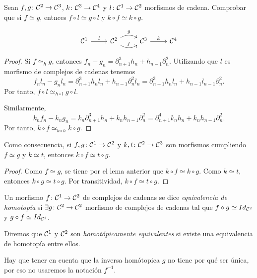 \documentclass[HS.tex]{subfiles}
\begin{document}
\begin{lemma}
Sean $f,g \colon \mathcal{C}^2 \to \mathcal{C}^3$, $k \colon \mathcal{C}^3 \to \mathcal{C}^4$ y $l \colon \mathcal{C}^1 \to \mathcal{C}^2$ morfismos de cadena. Comprobar que si $f \simeq g$, entnces $f \circ l \simeq g \circ l$ y $k \circ f \simeq k \circ g$.

\[
\begin{tikzcd}
\CC^1 \arrow[r,"l"] & \CC^2 \arrow[r,bend right,"f"] \arrow[r,bend left,"g"]& \CC^3 \arrow[r,"k"] & \CC^4
\end{tikzcd}
\]
\end{lemma}
\begin{proof}
Si $f\simeq_h g$, entonces $f_n-g_n=\partial^3_{n+1}h_n+h_{n-1}\partial_n^2$. Utilizando que $l$ es morfismo de complejos de cadenas tenemos 
\[
f_nl_n-g_nl_n=\partial^3_{n+1}h_nl_n+h_{n-1}\partial_n^2l_n=\partial^3_{n+1}h_nl_n+h_{n-1}l_{n-1}\partial_n^2.
\]
Por tanto, $f\circ l\simeq_{h\circ l} g\circ l$.

Similarmente, 
\[
k_nf_n-k_ng_n=k_n\partial^3_{n+1}h_n+k_nh_{n-1}\partial_n^2=\partial^4_{n+1}k_nh_n+k_nh_{n-1}\partial_n^2.
\]
Por tanto, $k\circ f\simeq_{k\circ h} k\circ g$. 
\end{proof}

\begin{coro}
Como consecuencia, si $f, g \colon \mathcal{C}^1 \to \mathcal{C}^2$ y $k,t \colon \mathcal{C}^2 \to \mathcal{C}^3$ son morfismos cumpliendo $f \simeq g$ y $k \simeq t$, entonces $k \circ f \simeq t \circ g$.
\end{coro}
\begin{proof}
Como $f \simeq g$, se tiene por el lema anterior que $k \circ f \simeq k \circ g$.
Como $k \simeq t$, entonces $k \circ g \simeq t \circ g$.
Por transitividad, $k \circ f \simeq t \circ g$.
\end{proof}

\begin{defi}
Un morfismo $f \colon \mathcal{C}^1 \to \mathcal{C}^2$ de complejos de cadenas se dice \emph{equivalencia de homotopía} si $\exists g \colon \mathcal{C}^2 \to \mathcal{C}^2$ morfismo de complejos de cadenas tal que $f \circ g \simeq Id_{\mathcal{C}^2}$ y $g \circ f \simeq Id_{\mathcal{C}^1}$.

Diremos que $\mathcal{C}^1$ y $\mathcal{C}^2$ son \emph{homotópicamente equivalentes} si existe una equivalencia de homotopía entre ellos.
\end{defi}

Hay que tener en cuenta que la inversa homótopica $g$ no tiene por qué ser única, por eso no usaremos la notación $f^{-1}$.
\end{document}
